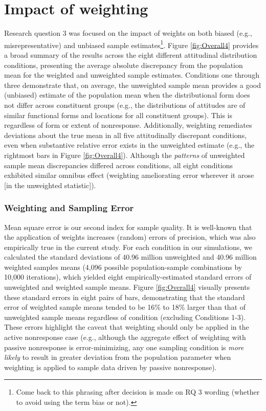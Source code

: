 \documentclass[
  man,mask]{apa7}
\begin{document}
\section{Impact of weighting}\label{impact-of-weighting}

Research question 3 was focused on the impact of weights on both biased (e.g., misrepresentative) and unbiased sample estimates\footnote{Come back to this phrasing after decision is made on RQ 3 wording (whether to avoid using the term bias or not).}. Figure \ref{fig:Overall4} provides a broad summary of the results across the eight different attitudinal distribution conditions, presenting the average absolute discrepancy from the population mean for the weighted and unweighted sample estimates. Conditions one through three demonstrate that, on average, the unweighted sample mean provides a good (unbiased) estimate of the population mean when the distributional form does not differ across constituent groups (e.g., the distributions of attitudes are of similar functional forms and locations for all constituent groups). This is regardless of form or extent of nonresponse. Additionally, weighting remediates deviations about the true mean in all five attitudinally discrepant conditions, even when substantive relative error exists in the unweighted estimate (e.g., the rightmost bars in Figure \ref{fig:Overall4}). Although the \emph{patterns} of unweighted sample mean discrepancies differed across conditions, all eight conditions exhibited similar omnibus effect (weighting ameliorating error wherever it arose {[}in the unweighted statistic{]}).

\subsubsection{Weighting and Sampling Error}\label{weighting-and-sampling-error}

Mean square error is our second index for sample quality. It is well-known that the application of weights increases (random) errors of precision, which was also empirically true in the current study. For each condition in our simulations, we calculated the standard deviations of 40.96 million unweighted and 40.96 million weighted samples means (4,096 possible population-sample combinations by 10,000 iterations), which yielded eight empirically-estimated standard errors of unweighted and weighted sample means. Figure \ref{fig:Overall4} visually presents these standard errors in eight pairs of bars, demonstrating that the standard error of weighted sample means tended to be 16\% to 18\% larger than that of unweighted sample means regardless of condition (excluding Conditions 1-3). These errors highlight the caveat that weighting should only be applied in the active nonresponse case (e.g., although the aggregate effect of weighting with passive nonresponse is error-minimizing, any one sampling condition is \emph{more likely} to result in greater deviation from the population parameter when weighting is applied to sample data driven by passive nonresponse).
\end{document}
